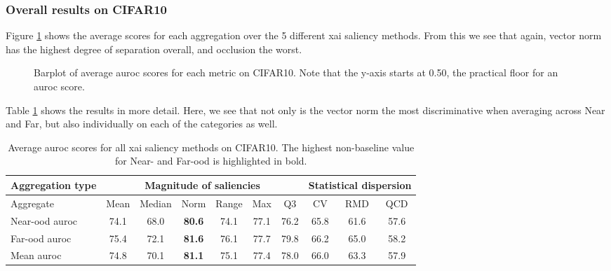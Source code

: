 \documentclass[UKenglish]{uiomasterthesis} %
\theoremstyle{definition}
\begin{document}
\subsubsection{Overall results on CIFAR10} \label{section:salagg_val_cifar10}

Figure \ref{fig:cifar10_all_metrics_barplot} shows the average scores for each aggregation over the 5 different \ac{xai} saliency methods. From this we see that again, vector norm has the highest degree of separation overall, and occlusion the worst. 

\begin{figure}[hbtp]
    \begin{center}
        
    \end{center}
    \caption[Average AUROC scores for magnitude aggregations on CIFAR10]{Barplot of average \ac{auroc} scores for each metric on CIFAR10. Note that the y-axis starts at 0.50, the practical floor for an \ac{auroc} score.}
    \label{fig:cifar10_all_metrics_barplot}
\end{figure}

Table \ref{table:cifar10_all_metrics} shows the results in more detail. Here, we see that not only is the vector norm the most discriminative when averaging across Near and Far, but also individually on each of the categories as well.

\begin{table}[hbtp]
\setlength\tabcolsep{3pt}
\begin{center}
\begin{tabular}{ |p{5.1em}|c c c c c c|c c c| }
    \hline
     \centering Aggregation type & \multicolumn{6}{c|}{Magnitude of saliencies} & \multicolumn{3}{p{8em}|}{\centering Statistical dispersion} \\
    \hline
    Aggregate & Mean & Median & Norm & Range & Max & Q3 & CV & RMD & QCD  \\
    \hline
    \rowcolor{near!50}
    Near-\ac{ood} \ac{auroc} & 74.1 & 68.0 &\textbf{ 80.6 }& 74.1 & 77.1 & 76.2 & 65.8 & 61.6 & 57.6  \\
    \hline
    \rowcolor{far!50}
    Far-\ac{ood} \ac{auroc} & 75.4 & 72.1 &\textbf{ 81.6 }& 76.1 & 77.7 & 79.8 & 66.2 & 65.0 & 58.2  \\
    \hline
    Mean \ac{auroc} & 74.8 & 70.1 &\textbf{ 81.1 }& 75.1 & 77.4 & 78.0 & 66.0 & 63.3 & 57.9  \\
    \hline
    \end{tabular}
    \caption[Average \ac{auroc} scores over all \ac{xai} saliency methods on CIFAR10]{Average \ac{auroc} scores for all \ac{xai} saliency methods on CIFAR10. The highest non-baseline value for Near- and Far-\ac{ood} is highlighted in bold. }
    \label{table:cifar10_all_metrics}
\end{center}
\setlength\tabcolsep{6pt}
\end{table}
\end{document}
